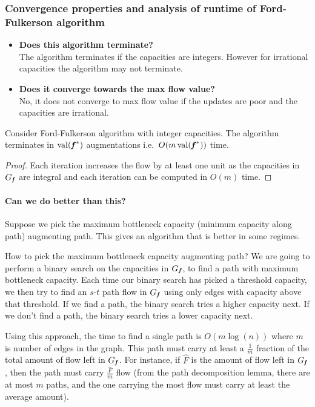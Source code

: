 \subsubsection{Convergence properties and analysis of runtime of Ford-Fulkerson algorithm}
\begin{itemize}
    \item \textbf{Does this algorithm terminate?}\\
    The algorithm terminates if the capacities are integers. However for irrational capacities the algorithm may not terminate.
    \item \textbf{Does it converge towards the max flow value?}\\
    No, it does not converge to max flow value if the updates are poor and the capacities are irrational.
\end{itemize}

\begin{lemma}
Consider Ford-Fulkerson algorithm with integer capacities. The algorithm terminates in \(\operatorname*{val}(\boldsymbol{\mathit{f}}^*)\) augmentations i.e.\ $O(m \operatorname*{val}(\boldsymbol{\mathit{f}}^*))$ time.
\end{lemma}
\begin{proof}
Each iteration increases the flow by at least one unit as the
capacities in \(G_{\boldsymbol{\mathit{f}}}\) are integral and each iteration can be
computed in  $O(m)$ time.
\end{proof}

\paragraph{Can we do better than this?}
Suppose we pick the maximum bottleneck capacity (minimum capacity
along path) augmenting path. This gives an algorithm that is better in
some regimes.

How to pick the maximum bottleneck capacity augmenting path? We are
going to perform a binary search on the capacities in \(G_{\boldsymbol{\mathit{f}}}\), to
find a path with maximum bottleneck capacity.
Each time our binary search has picked a threshold capacity, we then
try to find an $s$-$t$ path flow in \(G_{\boldsymbol{\mathit{f}}}\) using only  edges with
capacity above that threshold. If we find a path, the binary search
tries a higher capacity next. If we don't find a path, the binary search
tries a lower capacity next.

Using this approach, the time to find a single path is $O(m \log(n))$ where $m$ is number of edges in the graph.
This path must carry at least a \( \frac{1}{m}\) fraction of the total
amount of flow left in \(G_{\boldsymbol{\mathit{f}}}\). For instance, if \(\hat{F}\) is
the amount of flow left in \(G_{\boldsymbol{\mathit{f}}}\), then the path must carry
\(\frac{\hat{F}}{m}\) flow (from the path decomposition lemma, there
are at most $m$ paths, and the one carrying the most flow must carry
at least the average amount).

